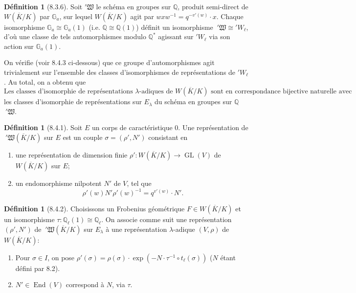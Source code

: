\documentclass[11pt]{amsart}
\theoremstyle{plain}
\theoremstyle{definition}
\newtheorem{definition}[theorem]{D\'efinition}
\DeclareMathOperator{\End}{End}
\DeclareMathOperator{\GL}{GL}
\begin{document}
\begin{definition}[8.3.6]
Soit $'\mathfrak{W}$ le sch\'ema en groupes sur $\mathbb{Q}$, produit semi-direct de $W(\overline{K}/K)$ par $\mathbb{G}_a$, sur lequel $W(\overline{K}/K)$ agit par $w x w^{-1} = q^{-v'(w)} \cdot x$. Chaque isomorphisme $\mathbb{G}_a \cong \mathbb{G}_a(1)$ (i.e. $\mathbb{Q} \cong \mathbb{Q}(1)$) d\'efinit un isomorphisme $\ '\mathfrak{W} \cong 'W_\ell$, d'o\`u une classe de tels automorphismes modulo $\mathbb{Q}^*$ agissant sur $'W_\ell$ via son action sur $\mathbb{G}_a(1)$.

On v\'erifie (voir 8.4.3 ci-dessous) que ce groupe d'automorphismes agit trivialement sur l'ensemble des classes d'isomorphismes de repr\'esentations de $'W_\ell$. Au total, on a obtenu que
\begin{equation}
\text{Les classes d'isomorphie de repr\'esentations $\lambda$-adiques de $W(\overline{K}/K)$ sont en correspondance bijective naturelle avec}
\tag{8.3.7}
\end{equation}
les classes d'isomorphie de repr\'esentations sur $E_\lambda$ du sch\'ema en groupes sur $\mathbb{Q}$ $\ '\mathfrak{W}$.
\end{definition}

\begin{definition}[8.4.1]
Soit $E$ un corps de caract\'eristique 0. Une repr\'esentation de $\ '\mathfrak{W}(\overline{K}/K)$ sur $E$ est un couple $\sigma = (\rho',N')$ consistant en
\begin{enumerate}
\item[(a)] une repr\'esentation de dimension finie $\rho': W(\overline{K}/K) \to \GL(V)$ de $W(\overline{K}/K)$ sur $E$;
\item[(b)] un endomorphisme nilpotent $N'$ de $V$, tel que
\begin{equation}
\rho'(w) N' \rho'(w)^{-1} = q^{v'(w)} \cdot N'.
\tag{8.4.1.1}
\end{equation}
\end{enumerate}
\end{definition}

\begin{definition}[8.4.2]
Choisissons un Frobenius g\'eom\'etrique $F \in W(\overline{K}/K)$ et un isomorphisme $\tau: \mathbb{Q}_\ell(1) \cong \mathbb{Q}_\ell$. On associe comme suit une repr\'esentation $(\rho',N')$ de $\ '\mathfrak{W}(\overline{K}/K)$ sur $E_\lambda$ \`a une repr\'esentation $\lambda$-adique $(V,\rho)$ de $W(\overline{K}/K)$:
\begin{enumerate}
\item[(a)] Pour $\sigma \in I$, on pose $\rho'(\sigma) = \rho(\sigma) \cdot \exp(-N \cdot \tau^{-1} \circ t_\ell(\sigma))$ ($N$ \'etant d\'efini par 8.2).
\item[(b)] $N' \in \End(V)$ correspond \`a $N$, via $\tau$.
\end{enumerate}
\end{definition}
\end{document}
